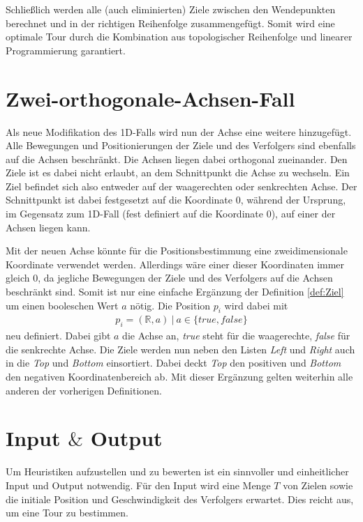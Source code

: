 \documentclass[german,version-2019-11]{uzl-thesis}
\begin{document}
Schließlich werden alle (auch eliminierten) Ziele zwischen den Wendepunkten berechnet und in der richtigen Reihenfolge zusammengefügt. Somit wird eine optimale Tour durch die Kombination aus topologischer Reihenfolge und linearer Programmierung garantiert.


\section{Zwei-orthogonale-Achsen-Fall}

Als neue Modifikation des 1D-Falls wird nun der Achse eine weitere hinzugefügt. Alle Bewegungen und Positionierungen der Ziele und des Verfolgers sind ebenfalls auf die Achsen beschränkt. Die Achsen liegen dabei orthogonal zueinander. Den Ziele ist es dabei nicht erlaubt, an dem Schnittpunkt die Achse zu wechseln. Ein Ziel befindet sich also entweder auf der waagerechten oder senkrechten Achse. Der Schnittpunkt ist dabei festgesetzt auf die Koordinate $0$, während der Ursprung, im Gegensatz zum 1D-Fall (fest definiert auf die Koordinate $0$), auf einer der Achsen liegen kann.

Mit der neuen Achse könnte für die Positionsbestimmung eine zweidimensionale Koordinate verwendet werden. Allerdings wäre einer dieser Koordinaten immer gleich $0$, da jegliche Bewegungen der Ziele und des Verfolgers auf die Achsen beschränkt sind. Somit ist nur eine einfache Ergänzung der Definition \ref{def:Ziel} um einen booleschen Wert $a$ nötig. Die Position $p_i$ wird dabei mit 
\begin{align*}
p_i = (\mathbb{R}, a) ~|~ a\in \{true, false\}
\end{align*}
neu definiert. Dabei gibt $a$ die Achse an, \emph{true} steht für die waagerechte, \emph{false} für die senkrechte Achse. Die Ziele werden nun neben den Listen \emph{Left} und \emph{Right} auch in die \emph{Top} und \emph{Bottom} einsortiert. Dabei deckt \emph{Top} den positiven und \emph{Bottom} den negativen Koordinatenbereich ab. Mit dieser Ergänzung gelten weiterhin alle anderen der vorherigen Definitionen.

\section{Input $\&$ Output}

Um Heuristiken aufzustellen und zu bewerten ist ein sinnvoller und einheitlicher Input und Output notwendig. Für den Input wird eine Menge $T$ von Zielen sowie die initiale Position und Geschwindigkeit des Verfolgers erwartet. Dies reicht aus, um eine Tour zu bestimmen. 
\end{document}

